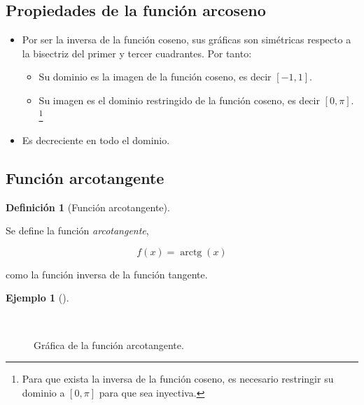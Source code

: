 \documentclass[
  a4paper,
]{scrreport}
\providecommand{\tightlist}{%
  \setlength{\itemsep}{0pt}\setlength{\parskip}{0pt}}\usepackage{longtable,booktabs,array}
\theoremstyle{plain}
\theoremstyle{plain}
\theoremstyle{definition}
\newtheorem{definition}{Definición}[chapter]
\theoremstyle{definition}
\newtheorem{example}{Ejemplo}[chapter]
\theoremstyle{plain}
\theoremstyle{remark}
\begin{document}
\hypertarget{propiedades-de-la-funciuxf3n-arcoseno-1}{%
\subsection{Propiedades de la función
arcoseno}\label{propiedades-de-la-funciuxf3n-arcoseno-1}}

\begin{itemize}
\tightlist
\item
  Por ser la inversa de la función coseno, sus gráficas son simétricas
  respecto a la bisectriz del primer y tercer cuadrantes. Por tanto:

  \begin{itemize}
  \tightlist
  \item
    Su dominio es la imagen de la función coseno, es decir \([-1,1]\).
  \item
    Su imagen es el dominio restringido de la función coseno, es decir
    \([0,\pi]\). \footnote{Para que exista la inversa de la función
      coseno, es necesario restringir su dominio a \([0,\pi]\) para que
      sea inyectiva.}
  \end{itemize}
\item
  Es decreciente en todo el dominio.
\end{itemize}

\hypertarget{funciuxf3n-arcotangente}{%
\subsection{Función arcotangente}\label{funciuxf3n-arcotangente}}

\leavevmode{}%
\begin{definition}[Función arcotangente]\label{def-funcion-arcotangente}

Se define la función \emph{arcotangente},

\[f(x)=\operatorname{arctg}(x)\]

como la función inversa de la función tangente.

\end{definition}

\leavevmode{}%
\begin{example}[]\label{exm-funcion-arcotangente}

~

\begin{figure}

{\centering 



}

\caption{Gráfica de la función arcotangente.}

\end{figure}

\end{example}
\end{document}
